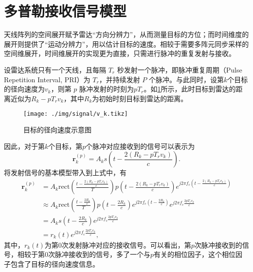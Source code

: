 \section{多普勒接收信号模型}
天线阵列的空间展开赋予雷达``方向分辨力''，从而测量目标的方位；而时间维度的展开则提供了``运动分辨力''，用以估计目标的速度。相较于需要多阵元同步采样的空间维展开，时间维展开的实现更为直接，只需进行脉冲的重复发射与接收。

设雷达系统只有一个天线，且每隔 \(T_r\) 秒发射一个脉冲，即脉冲重复周期（Pulse Repetition Interval, PRI）为 \(T_r\)，并持续发射 \(P\) 个脉冲。与此同时，设第\( k \)个目标的径向速度为\( v_k \)，则第 \( p \) 脉冲发射的时刻为\( p T_r \)。如\cref{fig_v_k}所示，此时目标到雷达的距离近似为\( R_k -  p T_r v_k\)，其中\( R_k \)为初始时刻目标到雷达的距离。

\begin{figure}[htb!]
    \centering
    \texttt{[image: ./img/signal/v\_k.tikz]}
    \caption{目标的径向速度示意图}
    \label{fig_v_k}
\end{figure}

因此，对于第\( k \)个目标，第\( p \)个脉冲对应接收到的信号可以表示为
\[
    \bm{r}_k^{(p)} = A_k s\left(t - \frac{2 (R_k - p T_r v_k)}{c}\right).
\]
将发射信号的基本模型带入到上式中，有
\[
    \begin{split}
        \bm{r}_k^{(p)} & = A_k \text{rect}\left(\frac{t - \frac{2 (R_k - p T_r v_k)}{c}}{T}\right) p\left(t - \frac{2 (R_k - p T_r v_k)}{c}\right) e^{j 2 \pi f_c \left(t - \frac{2 (R_k - p T_r v_k)}{c}\right)}   \\
                       & \approx A_k \text{rect}\left(\frac{t - \frac{2 R_k}{c}}{T}\right) p\left(t - \frac{2 R_k}{c}\right) e^{j 2 \pi f_c \left(t - \frac{2 R_k}{c}\right)} e^{j 2 \pi f_c \frac{2 p T_r v_k}{c}} \\
                       & = A_k s\left(t - \frac{2 R_k}{c}\right) e^{j 2 \pi f_c \frac{2 p T_r v_k}{c}}                                                                                                              \\
                       & = r_k(t) e^{j 2 \pi f_c \frac{2 p T_r v_k}{c}},
    \end{split}
\]
其中，\( r_k(t) \)为第0次发射脉冲对应的接收信号。可以看出，第\( p \)次脉冲接收到的信号，相较于第0次脉冲接收到的信号，多了一个与\( p \)有关的相位因子，这个相位因子包含了目标的径向速度信息。

